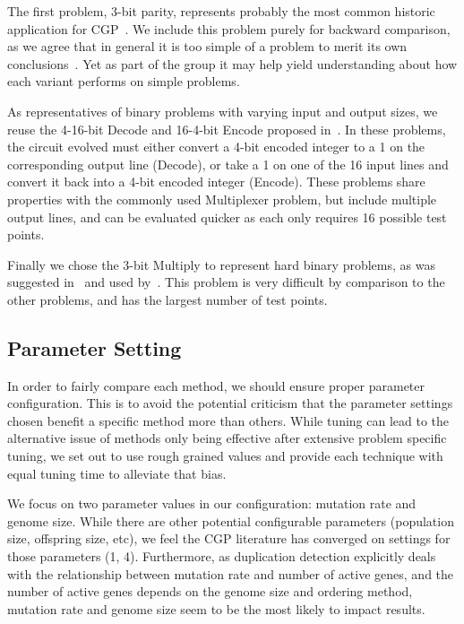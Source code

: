 \documentclass[journal]{IEEEtran}
\begin{document}
The first problem, 3-bit parity, represents probably the most
common historic application for
CGP~\cite{yu:2001:neutrality,miller:2006:redundancy,walker:2008:cgpmodules}.
We include this problem purely for backward comparison, as we agree that in general
it is too simple of a problem to merit its own conclusions~\cite{white:2013:bgpb}.
Yet as part of the group it may help yield understanding about how each variant
performs on simple problems.

As representatives of binary problems with varying input and output sizes, we
reuse the 4-16-bit Decode and 16-4-bit Encode proposed in~\cite{goldman:2013:cgpwaste}.
In these problems, the circuit evolved must either convert a 4-bit encoded integer
to a 1 on the corresponding output line (Decode), or take a 1 on one of the 16
input lines and convert it back into a 4-bit encoded integer (Encode).  These
problems share properties with the commonly used Multiplexer problem, but include
multiple output lines, and can be evaluated quicker as each only requires 16 possible
test points.

Finally we chose the 3-bit Multiply to represent hard binary problems,
as was suggested in~\cite{white:2013:bgpb} and used
by~\cite{vassilev:2000:neutrality,miller:2006:redundancy,walker:2008:cgpmodules}.
This problem is very difficult by comparison to the other problems, and has
the largest number of test points.




\subsection{Parameter Setting}
In order to fairly compare each method, we should ensure proper parameter configuration.
This is to avoid the potential criticism that the parameter settings chosen benefit
a specific method more than others.  While tuning can lead to the alternative issue
of methods only being effective after extensive problem specific tuning, we set out to use
rough grained values and provide each technique with equal tuning time to alleviate that bias.

We focus on two parameter values in our configuration: mutation rate and genome size.
While there are other potential configurable parameters (population size, offspring size, etc),
we feel the CGP literature has converged on settings for those parameters (1, 4).
Furthermore, as duplication detection explicitly deals with the relationship between
mutation rate and number of active genes, and the number of active genes depends
on the genome size and ordering method, mutation rate and genome size seem to be
the most likely to impact results.
\end{document}
